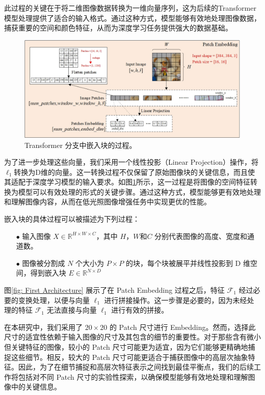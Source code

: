 \documentclass[a4paper]{ctexart}
\begin{document}
此过程的关键在于将二维图像数据转换为一维向量序列，这为后续的Transformer模型处理提供了适合的输入格式。通过这种方式，模型能够有效地处理图像数据，捕获重要的空间和颜色特征，从而为深度学习任务提供强大的数据基础。
	
\begin{figure}[htb]
	\centering 
	\includegraphics[width=0.8\columnwidth]{picture/LLIE/My Architecture/Patch Embedding(ViT)}
	\caption{
		\label{fig: Patch Embedding(ViT)} 
		Transformer 分支中嵌入块的过程。
	}
\end{figure}
	
为了进一步处理这些向量，我们采用一个线性投影（Linear Projection）操作，将$\ell_1$转换为D维的向量。这一转换过程不仅保留了原始图像块的关键信息，而且使其适配于深度学习模型的输入要求。如图\ref{fig: Patch Embedding(ViT)}所示，这一过程是将图像的空间特征转换为模型可以有效处理的形式的关键步骤。通过这种方式，模型能够更有效地处理和理解图像内容，从而在低光照图像增强任务中实现更优的性能。
	
嵌入块的具体过程可以被描述为下列过程：
	
\begin{itemize}
	\item[$\bullet$] 
	输入图像 $X \in \mathbb{R}^{H \times W \times C}$，其中 $H$，$W$和$C$ 分别代表图像的高度、宽度和通道数。
	\item[$\bullet$]
	图像被分割成 $N$ 个大小为 $P \times P$ 的块，每个块被展平并线性投影到 D 维空间，得到嵌入块 $E \in \mathbb{R}^{N \times D}$
\end{itemize}

图\ref{fig: First Architecture} 展示了在 Patch Embedding 过程之后，特征 $\mathcal{F}_1$ 经过必要的变换处理，以便与向量 $\ell_1$ 进行拼接操作。这一步骤是必要的，因为未经处理的特征 $\mathcal{F}_1$ 无法直接与向量 $\ell_1$ 进行有效的拼接。

在本研究中，我们采用了 $20 \times 20$ 的 Patch 尺寸进行 Embedding。然而，选择此尺寸的适宜性依赖于输入图像的尺寸及其包含的细节的重要性。对于那些含有微小但关键特征的图像，较小的 Patch 尺寸可能更为适宜，因为它们能够更精确地捕捉这些细节。相反，较大的 Patch 尺寸可能更适合于捕获图像中的高层次抽象特征。因此，为了在细节捕捉和高层次特征表示之间找到最佳平衡点，我们的后续工作将包括对不同 Patch 尺寸的实验性探索，以确保模型能够有效地处理和理解图像中的关键信息。
	
\end{document}
